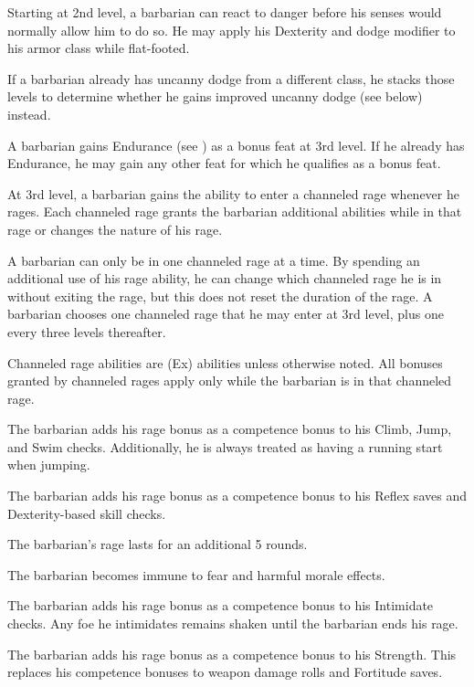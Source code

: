  Starting at 2nd level, a barbarian can react to danger before his senses would normally allow him to do so. He may apply his Dexterity and dodge modifier to his armor class while flat-footed.

If a barbarian already has uncanny dodge from a different class, he stacks those levels to determine whether he gains improved uncanny dodge (see below) instead.

 A barbarian gains Endurance (see ) as a bonus feat at 3rd level. If he already has Endurance, he may gain any other feat for which he qualifies as a bonus feat.

 At 3rd level, a barbarian gains the ability to enter a channeled rage whenever he rages. Each channeled rage grants the barbarian additional abilities while in that rage or changes the nature of his rage.
\par A barbarian can only be in one channeled rage at a time. By spending an additional use of his rage ability, he can change which channeled rage he is in without exiting the rage, but this does not reset the duration of the rage. A barbarian chooses one channeled rage that he may enter at 3rd level, plus one every three levels thereafter.
\par Channeled rage abilities are (Ex) abilities unless otherwise noted. All bonuses granted by channeled rages apply only while the barbarian is in that channeled rage.

 The barbarian adds his rage bonus as a competence bonus to his Climb, Jump, and Swim checks. Additionally, he is always treated as having a running start when jumping.

 The barbarian adds his rage bonus as a competence bonus to his Reflex saves and Dexterity-based skill checks.

 The barbarian's rage lasts for an additional 5 rounds.

 The barbarian becomes immune to fear and harmful morale effects.

 The barbarian adds his rage bonus as a competence bonus to his Intimidate checks. Any foe he intimidates remains shaken until the barbarian ends his rage.

 The barbarian adds his rage bonus as a competence bonus to his Strength. This replaces his competence bonuses to weapon damage rolls and Fortitude saves.

